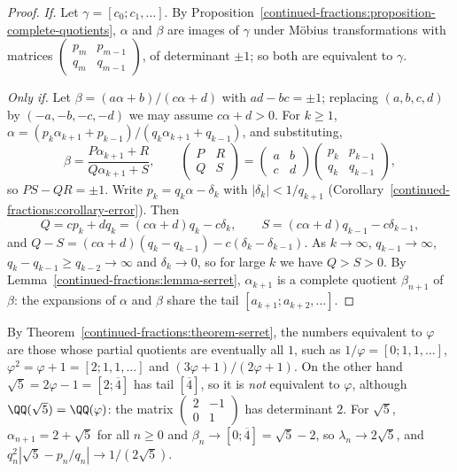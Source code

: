 \begin{proof}
\emph{If.} Let $\gamma = [c_0; c_1, \ldots]$. By Proposition~\ref{continued-fractions:proposition-complete-quotients}, $\alpha$ and $\beta$ are images of $\gamma$ under Möbius transformations with
matrices $\begin{pmatrix} p_m & p_{m-1}\\ q_m & q_{m-1}\end{pmatrix}$, of determinant $\pm 1$; so both are equivalent to $\gamma$.

\emph{Only if.} Let $\beta = (a\alpha + b)/(c\alpha + d)$ with $ad - bc = \pm 1$; replacing $(a, b, c, d)$ by $(-a, -b, -c, -d)$ we may assume $c\alpha + d > 0$. For $k \geq 1$,
$\alpha = (p_k\alpha_{k+1} + p_{k-1})/(q_k\alpha_{k+1} + q_{k-1})$, and substituting,
\[
\beta = \frac{P\alpha_{k+1} + R}{Q\alpha_{k+1} + S}, \qquad \begin{pmatrix} P & R\\ Q & S\end{pmatrix} = \begin{pmatrix} a & b\\ c & d\end{pmatrix}\begin{pmatrix} p_k & p_{k-1}\\ q_k & q_{k-1}\end{pmatrix},
\]
so $PS - QR = \pm 1$. Write $p_k = q_k\alpha - \delta_k$ with $|\delta_k| < 1/q_{k+1}$ (Corollary~\ref{continued-fractions:corollary-error}). Then
\[
Q = cp_k + dq_k = (c\alpha + d)q_k - c\delta_k, \qquad S = (c\alpha + d)q_{k-1} - c\delta_{k-1},
\]
and $Q - S = (c\alpha + d)(q_k - q_{k-1}) - c(\delta_k - \delta_{k-1})$. As $k \to \infty$, $q_{k-1} \to \infty$, $q_k - q_{k-1} \geq q_{k-2} \to \infty$ and $\delta_k \to 0$, so for large $k$ we have
$Q > S > 0$. By Lemma~\ref{continued-fractions:lemma-serret}, $\alpha_{k+1}$ is a complete quotient $\beta_{n+1}$ of $\beta$: the expansions of $\alpha$ and $\beta$ share the tail
$[a_{k+1}; a_{k+2}, \ldots]$.
\end{proof}

\begin{example}\label{continued-fractions:example-equivalent}
By Theorem~\ref{continued-fractions:theorem-serret}, the numbers equivalent to $\varphi$ are those whose partial quotients are eventually all $1$, such as $1/\varphi = [0; 1, 1, \ldots]$,
$\varphi^2 = \varphi + 1 = [2; 1, 1, \ldots]$ and $(3\varphi + 1)/(2\varphi + 1)$. On the other hand $\sqrt5 = 2\varphi - 1 = [2; \overline{4}]$ has tail $[\overline{4}]$, so it is \emph{not}
equivalent to $\varphi$, although $\QQ(\sqrt5) = \QQ(\varphi)$: the matrix $\begin{pmatrix} 2 & -1\\ 0 & 1\end{pmatrix}$ has determinant $2$. For $\sqrt5$, $\alpha_{n+1} = 2 + \sqrt5$ for all
$n \geq 0$ and $\beta_n \to [0; \overline{4}] = \sqrt5 - 2$, so $\lambda_n \to 2\sqrt5$, and $q_n^2|\sqrt5 - p_n/q_n| \to 1/(2\sqrt5)$.
\end{example}

